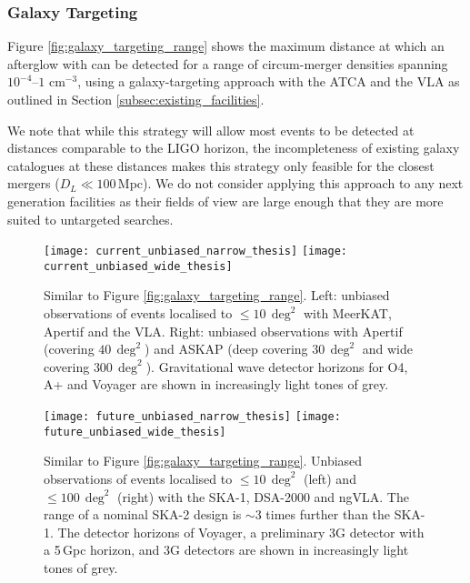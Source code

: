 \subsubsection{Galaxy Targeting}
Figure \ref{fig:galaxy_targeting_range} shows the maximum distance at which an afterglow with can be detected for a range of circum-merger densities spanning $10^{-4}$--$1\,$\,cm$^{-3}$, using a galaxy-targeting approach with the ATCA and the VLA as outlined in Section \ref{subsec:existing_facilities}.

We note that while this strategy will allow most events to be detected at distances comparable to the LIGO horizon, the incompleteness of existing galaxy catalogues at these distances makes this strategy only feasible for the closest mergers ($D_L\ll 100\,$Mpc). We do not consider applying this approach to any next generation facilities as their fields of view are large enough that they are more suited to untargeted searches.


\begin{figure*}
    \centering
    \texttt{[image: current\_unbiased\_narrow\_thesis]}
    \texttt{[image: current\_unbiased\_wide\_thesis]}
    \caption[Follow-up of mergers localised to $\leq 10\,\deg^2$ with current facilities]{Similar to Figure \ref{fig:galaxy_targeting_range}. Left: unbiased observations of events localised to $\leq 10\,\deg^2$ with MeerKAT, Apertif and the VLA. Right: unbiased observations with Apertif (covering $40\,\deg^2$) and ASKAP (deep covering $30\,\deg^2$ and wide covering $300\,\deg^2$). Gravitational wave detector horizons for O4, A+ and Voyager are shown in increasingly light tones of grey.}
    \label{fig:current_unbiased}
\end{figure*}

\begin{figure*}
    \centering
    \texttt{[image: future\_unbiased\_narrow\_thesis]}
    \texttt{[image: future\_unbiased\_wide\_thesis]}
    \caption[Follow-up of mergers localised to $\leq 10\,\deg^2$ with future facilities]{Similar to Figure \ref{fig:galaxy_targeting_range}. Unbiased observations of events localised to $\leq 10\,\deg^2$ (left) and $\leq 100\,\deg^2$ (right) with the SKA-1, DSA-2000 and ngVLA. The range of a nominal SKA-2 design is $\sim 3$ times further than the SKA-1. The detector horizons of Voyager, a preliminary 3G detector with a 5\,Gpc horizon, and 3G detectors are shown in increasingly light tones of grey.}
    \label{fig:future_unbiased}
\end{figure*}

